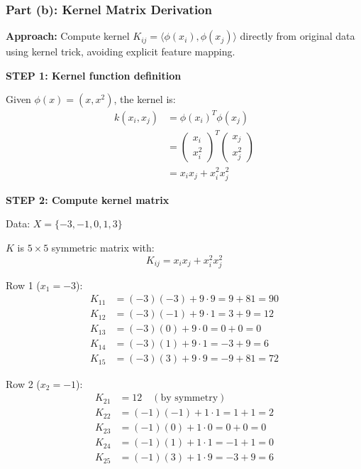 \documentclass[12pt]{article}
\begin{document}
\subsubsection{Part (b): Kernel Matrix Derivation}

\begin{solution}

\textbf{Approach:} Compute kernel $K_{ij} = \langle \phi(x_i), \phi(x_j) \rangle$ directly from original data using kernel trick, avoiding explicit feature mapping.

\textbf{STEP 1: Kernel function definition}

Given $\phi(x) = (x, x^2)$, the kernel is:
\begin{align*}
k(x_i, x_j) &= \phi(x_i)^T \phi(x_j) \\
&= \begin{pmatrix} x_i \\ x_i^2 \end{pmatrix}^T \begin{pmatrix} x_j \\ x_j^2 \end{pmatrix} \\
&= x_i x_j + x_i^2 x_j^2
\end{align*}

\textbf{STEP 2: Compute kernel matrix}

Data: $X = \{-3, -1, 0, 1, 3\}$

$K$ is $5 \times 5$ symmetric matrix with:
\[
K_{ij} = x_i x_j + x_i^2 x_j^2
\]

Row 1 ($x_1 = -3$):
\begin{align*}
K_{11} &= (-3)(-3) + 9 \cdot 9 = 9 + 81 = 90 \\
K_{12} &= (-3)(-1) + 9 \cdot 1 = 3 + 9 = 12 \\
K_{13} &= (-3)(0) + 9 \cdot 0 = 0 + 0 = 0 \\
K_{14} &= (-3)(1) + 9 \cdot 1 = -3 + 9 = 6 \\
K_{15} &= (-3)(3) + 9 \cdot 9 = -9 + 81 = 72
\end{align*}

Row 2 ($x_2 = -1$):
\begin{align*}
K_{21} &= 12 \quad (\text{by symmetry}) \\
K_{22} &= (-1)(-1) + 1 \cdot 1 = 1 + 1 = 2 \\
K_{23} &= (-1)(0) + 1 \cdot 0 = 0 + 0 = 0 \\
K_{24} &= (-1)(1) + 1 \cdot 1 = -1 + 1 = 0 \\
K_{25} &= (-1)(3) + 1 \cdot 9 = -3 + 9 = 6
\end{align*}


\end{solution}
\end{document}
